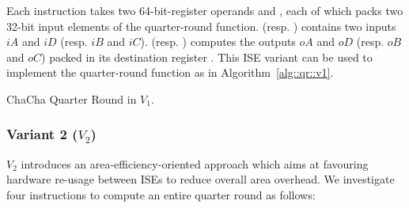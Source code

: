 \begin{itemize}


\end{itemize}

Each instruction takes two 64-bit-register operands  and , each of which packs two 32-bit input elements of the quarter-round function.  (resp. ) contains two inputs $iA$ and $iD$ (resp. $iB$ and $iC$).  (resp. ) computes the outputs $oA$ and $oD$ (resp. $oB$ and $oC$) packed in its destination register . 
This ISE variant can be used to implement the quarter-round function as in Algorithm~\ref{alg::qr::v1}.

\begin{algorithm}
\BlankLine
{}
\caption{ChaCha Quarter Round in $V_1$.}
\label{alg::qr::v1}
\end{algorithm}


\subsubsection{Variant 2 ($V_2$)}
$V_2$ introduces an area-efficiency-oriented approach which aims at favouring hardware re-usage between ISEs to reduce overall area overhead. 
We investigate four instructions to compute an entire quarter round as follows:

